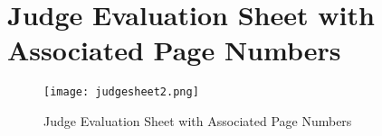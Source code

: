 \section{Judge Evaluation Sheet with Associated Page Numbers}
\begin{figure}[H]
    \centering
    \texttt{[image: judgesheet2.png]}
    \caption{Judge Evaluation Sheet with Associated Page Numbers}
  \end{figure}